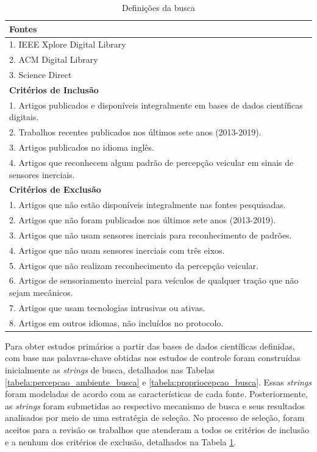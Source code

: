 \begin{table}[h!]
    \small
    \centering
    \caption{Definições da busca}
    \label{tabela:definicao_pesquisa}
    \begin{tabular}{l}
        \toprule
        \textbf{Fontes} \\
        \toprule
        1. IEEE Xplore Digital Library \\
        2. ACM Digital Library \\
        3. Science Direct \\
        \toprule
        \textbf{Critérios de Inclusão}\\
        \toprule
        1. Artigos publicados e disponíveis integralmente em bases de dados científicas digitais.\\
        2. Trabalhos recentes publicados nos últimos sete anos (2013-2019).\\ 
        3. Artigos publicados no idioma inglês.\\
        4. Artigos que reconhecem algum padrão de percepção veicular em sinais de sensores inerciais.\\
        \toprule
        \textbf{Critérios de Exclusão}\\
        \toprule
        1. Artigos que não estão disponíveis integralmente nas fontes pesquisadas.\\
        2. Artigos que não foram publicados nos últimos sete anos (2013-2019).\\
        3. Artigos que não usam sensores inerciais para reconhecimento de padrões.\\
        4. Artigos que não usam sensores inerciais com três eixos.\\
        5. Artigos que não realizam reconhecimento da percepção veicular. \\
        6. Artigos de sensoriamento inercial para veículos de qualquer tração que não sejam mecânicos. \\
        7. Artigos que usam tecnologias intrusivas ou ativas.\\
        8. Artigos em outros idiomas, não incluídos no protocolo.\\
        \bottomrule
    \end{tabular}
\end{table}

Para obter estudos primários a partir das bases de dados científicas definidas, com base nas palavras-chave obtidas nos estudos de controle foram construídas inicialmente as \textit{strings} de busca, detalhados nas Tabelas \ref{tabela:percepcao_ambiente_busca} e \ref{tabela:propriocepcao_busca}. Essas \textit{strings} foram modeladas de acordo com as características de cada fonte. Posteriormente, as \textit{strings} foram submetidas ao respectivo mecanismo de busca e seus resultados analisados por meio de uma estratégia de seleção. No processo de seleção, foram aceitos para a revisão os trabalhos que atenderam a todos os critérios de inclusão e a nenhum dos critérios de exclusão, detalhados na Tabela \ref{tabela:definicao_pesquisa}.

